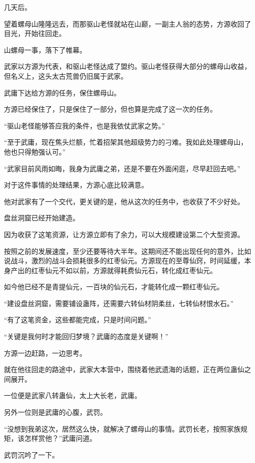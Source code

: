 
\begin{this_body}

几天后。

望着螺母山隆隆远去，而那驱山老怪就站在山巅，一副主人翁的态势，方源收回了目光，开始往回走。

山螺母一事，落下了帷幕。

武家以方源为代表，和驱山老怪达成了盟约。驱山老怪获得大部分的螺母山收益，但名义上，这头太古荒兽仍旧属于武家。

武庸下达给方源的任务，保住螺母山。

方源已经保住了，只是保住了一部分，但也算是完成了这一次的任务。

“驱山老怪能够答应我的条件，也是我依仗武家之势。”

“至于武庸，现在焦头烂额，忙着招架其他超级势力的刁难。我如此处理螺母山，他也只得勉强认可。”

“武家目前风雨如晦，我身为武庸之弟，还是不要在外面闲逛，尽早赶回去吧。”

对于这件事情的处理结果，方源心底比较满意。

他对武家有了一个交代，更关键的是，他从这次的任务中，也收获了不少好处。

盘丝洞窟已经开始建造。

因为收获了这笔资源，让方源立即有了余力，可以大规模建设第二个大型资源。

按照之前的发展速度，至少还要等待大半年。这期间还不能出现任何的意外，比如说战斗，激烈的战斗会损耗很多的红枣仙元。方源现在的至尊仙窍，时间延缓，本身产出的红枣仙元不如以前，方源就得耗费仙元石，转化成红枣仙元。

如今他已经不是青提仙元，一百块的仙元石，才能转化成一颗红枣仙元。

“建设盘丝洞窟，需要铺设蛊阵，还需要六转仙材阴柔丝，七转仙材恨水石。”

“有了这笔资金，这些都能完成，只是时间问题。”

“关键是我何时才能回归梦境？武庸的态度是关键啊！”

方源一边赶路，一边思考。

就在他往回走的路途中，武家大本营中，围绕着他武遗海的话题，正在两位蛊仙之间展开。

一位便是武家八转蛊仙，太上大长老，武庸。

另外一位则是武庸的心腹，武罚。

“没想到我弟这次，居然这么快，就解决了螺母山的事情。武罚长老，按照家族规矩，该怎样赏他？”武庸问道。

武罚沉吟了一下。


\end{this_body}
